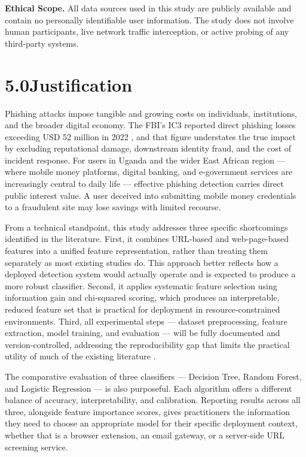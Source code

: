 \documentclass[11pt,letterpaper]{article}
\begin{document}
\textbf{Ethical Scope.} All data sources used in this study are publicly available and contain no personally identifiable user information. The study does not involve human participants, live network traffic interception, or active probing of any third-party systems.

\newpage
\section*{5.0\quad Justification}

Phishing attacks impose tangible and growing costs on individuals, institutions, and the broader digital economy. The FBI's IC3 reported direct phishing losses exceeding USD 52 million in 2022 \cite{ic3_2022}, and that figure understates the true impact by excluding reputational damage, downstream identity fraud, and the cost of incident response. For users in Uganda and the wider East African region --- where mobile money platforms, digital banking, and e-government services are increasingly central to daily life --- effective phishing detection carries direct public interest value. A user deceived into submitting mobile money credentials to a fraudulent site may lose savings with limited recourse.

From a technical standpoint, this study addresses three specific shortcomings identified in the literature. First, it combines URL-based and web-page-based features into a unified feature representation, rather than treating them separately as most existing studies do. This approach better reflects how a deployed detection system would actually operate and is expected to produce a more robust classifier. Second, it applies systematic feature selection using information gain and chi-squared scoring, which produces an interpretable, reduced feature set that is practical for deployment in resource-constrained environments. Third, all experimental steps --- dataset preprocessing, feature extraction, model training, and evaluation --- will be fully documented and version-controlled, addressing the reproducibility gap that limits the practical utility of much of the existing literature \cite{gundersen2018}.

The comparative evaluation of three classifiers --- Decision Tree, Random Forest, and Logistic Regression --- is also purposeful. Each algorithm offers a different balance of accuracy, interpretability, and calibration. Reporting results across all three, alongside feature importance scores, gives practitioners the information they need to choose an appropriate model for their specific deployment context, whether that is a browser extension, an email gateway, or a server-side URL screening service.
\end{document}
